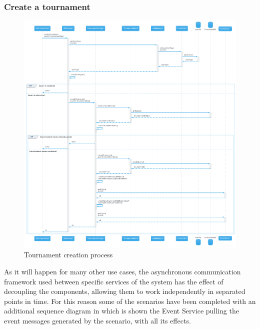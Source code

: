\subsubsection{Create a tournament}
\begin{figure}[H]
    \hspace{-0.7cm}
    \includegraphics[width=1.1\textwidth]{Diagrams/sequence/create_tournament.png}
    \caption{Tournament creation process}
\end{figure}
As it will happen for many other use cases, the asynchronous communication framework used between specific services of the system has the effect of decoupling the components, allowing them to work independently in separated points in time. For this reason some of the scenarios have been completed with an additional sequence diagram in which is shown the Event Service pulling the event messages generated by the scenario, with all its effects.

